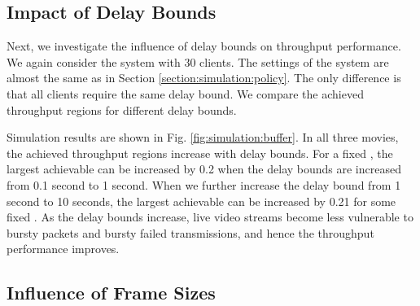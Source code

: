 \documentclass[10pt,nocopyrightspace]{sigplan-proc-varsize-1in}
\begin{document}
\subsection{Impact of Delay Bounds}

\begin{figure*}[t]
\hspace{0.01\linewidth} 
\hspace{0.01\linewidth} 
\caption{Achieved throughput regions for different delay bounds.}\label{fig:simulation:buffer}
\end{figure*}


Next, we investigate the influence of delay bounds on throughput performance. We again consider the system with 30 clients. The settings of the system are almost the same as in Section \ref{section:simulation:policy}. The only difference is that all clients require the same delay bound. We compare the achieved throughput regions for different delay bounds.

Simulation results are shown in Fig. \ref{fig:simulation:buffer}. In all three movies, the achieved throughput regions increase with delay bounds. For a fixed , the largest achievable  can be increased by 0.2 when the delay bounds are increased from 0.1 second to 1 second. When we further increase the delay bound from 1 second to 10 seconds, the largest achievable  can be increased by 0.21 for some fixed . As the delay bounds increase, live video streams become less vulnerable to bursty packets and bursty failed transmissions, and hence the throughput performance improves.

\subsection{Influence of Frame Sizes}

\begin{figure*}[t]
\hspace{0.01\linewidth} 
\hspace{0.01\linewidth} 
\caption{Achieved throughput regions for different frame sizes.}\label{fig:simulation:M}
\end{figure*}
\end{document}
